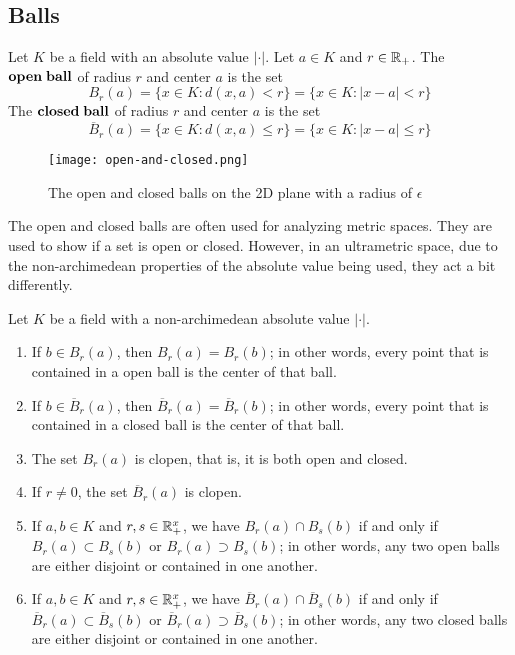 \documentclass[a4paper]{article}
\begin{document}
\subsection{Balls}

\begin{definition}[Balls]
Let $K$ be a field with an absolute value $|\cdot|$.  Let $a\in K$ and 
$r\in\mathbb R_+$.  The \(\bf{open\;ball}\) of radius $r$ and center $a$ is the set
\[
  B_r(a)=\{x\in K:d(x,a)<r\}=\{x\in K:|x-a|<r\}
\]
The \(\bf{closed\;ball}\) of radius $r$ and center $a$ is the set
\[
  \overline{B}_r(a)=\{x\in K:d(x,a)\leq r\}=\{x\in K:|x-a|\leq r\}
\]
\end{definition}

\begin{figure}[!h]
  \centering
  \texttt{[image: open-and-closed.png]}
  \caption{\label{fig:Balls}The open and closed balls on the 2D plane
  with a radius of \(\epsilon\)}
\end{figure}

The open and closed balls are often used for analyzing metric spaces.  
They are used to show if a set is open or closed.  However, in an 
ultrametric space, due to the non-archimedean properties of the 
absolute value being used, they act a bit differently.

\begin{theorem}
Let $K$ be a field with a non-archimedean absolute value $|\cdot|$.
\begin{enumerate}[label=\Roman*)]
  \item If $b\in B_r(a)$, then $B_r(a)=B_r(b)$; in other words, every
  point that is contained in a open ball is the center of that ball.
  \item If $b\in \overline{B}_r(a)$, then 
  $\overline{B}_r(a)=\overline{B}_r(b)$; in other words, every point
  that is contained in a closed ball is the center of that ball.
  \item The set $B_r(a)$ is clopen, that is, it is both open and
  closed.
  \item If $r\neq 0$, the set $\overline{B}_r(a)$ is clopen.
  \item If $a,b\in K$ and $r,s\in\mathbb R_+^x$, we have
  $B_r(a)\cap B_s(b)$ if and only if 
  $B_r(a)\subset B_s(b)$ or
  $B_r(a)\supset B_s(b)$; in other words, any two
  open balls are either disjoint or contained in one another.
  \item If $a,b\in K$ and $r,s\in\mathbb R_+^x$, we have
  $\overline{B}_r(a)\cap\overline{B}_s(b)$ if and only if 
  $\overline{B}_r(a)\subset\overline{B}_s(b)$ or
  $\overline{B}_r(a)\supset\overline{B}_s(b)$; in other words, any two
  closed balls are either disjoint or contained in one another.
\end{enumerate}
\end{theorem}
\end{document}
